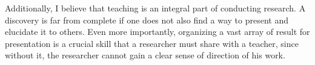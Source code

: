 \documentclass[11pt]{article}
\begin{document}

Additionally, I believe that teaching is an integral part of conducting research. A discovery is far from complete if one does not also find a way to present and elucidate it to others. Even more importantly, organizing a vast array of result for presentation is a crucial skill that a researcher must share with a teacher, since without it, the researcher cannot gain a clear sense of direction of his work. \newline
\end{document}
